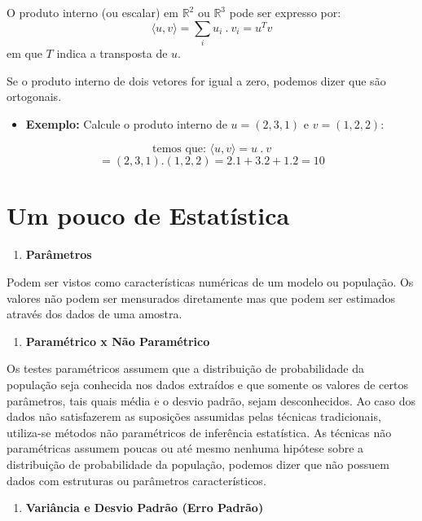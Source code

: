 \documentclass[
  openany]{book}
\providecommand{\tightlist}{%
  \setlength{\itemsep}{0pt}\setlength{\parskip}{0pt}}
\begin{document}
O produto interno (ou escalar) em \(\mathbb{R}^2\) ou \(\mathbb{R}^3\) pode ser expresso por:
\[\langle u,v \rangle =\sum_i u_i \ . \  v_i = u^Tv\]
em que \(T\) indica a transposta de \(u\).

Se o produto interno de dois vetores for igual a zero, podemos dizer que são ortogonais.

\begin{itemize}
\tightlist
\item
  \textbf{Exemplo:} Calcule o produto interno de \(u=(2,3,1)\) e \(v=(1,2,2)\):
\end{itemize}

\[\mbox{temos que: }\langle u,v \rangle =u \ . \  v\]
\[=(2,3,1).(1,2,2)=2.1+3.2+1.2=10\]

\hypertarget{um-pouco-de-estatuxedstica}{%
\section{Um pouco de Estatística}\label{um-pouco-de-estatuxedstica}}

\begin{enumerate}
\def\labelenumi{\arabic{enumi}.}
\tightlist
\item
  \textbf{Parâmetros}
\end{enumerate}

Podem ser vistos como características numéricas de um modelo ou população. Os valores não podem ser mensurados diretamente mas que podem ser estimados através dos dados de uma amostra.

\begin{enumerate}
\def\labelenumi{\arabic{enumi}.}
\setcounter{enumi}{1}
\tightlist
\item
  \textbf{Paramétrico x Não Paramétrico}
\end{enumerate}

Os testes paramétricos assumem que a distribuição de probabilidade da população seja conhecida nos dados extraídos e que somente os valores de certos parâmetros, tais quais média e o desvio padrão, sejam desconhecidos. Ao caso dos dados não satisfazerem as suposições assumidas pelas técnicas tradicionais, utiliza-se métodos não paramétricos de inferência estatística. As técnicas não paramétricas assumem poucas ou até mesmo nenhuma hipótese sobre a distribuição de probabilidade da população, podemos dizer que não possuem dados com estruturas ou parâmetros característicos.

\begin{enumerate}
\def\labelenumi{\arabic{enumi}.}
\setcounter{enumi}{2}
\tightlist
\item
  \textbf{Variância e Desvio Padrão (Erro Padrão)}
\end{enumerate}
\end{document}
